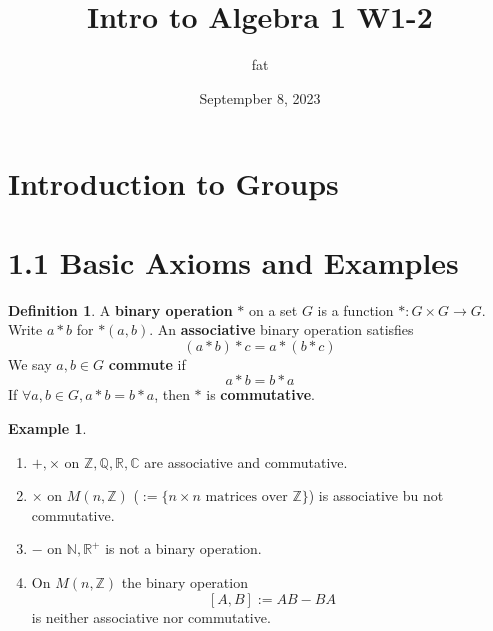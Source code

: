 \documentclass{article}
\title{Intro to Algebra 1 W1-2}
\author{fat}
\date{Septempber 8, 2023}
\theoremstyle{definition}
\newtheorem{ex}{Example}
\newtheorem{dfn}{Definition}
\newcommand{\CC}{\mathbb C}
\newcommand{\NN}{\mathbb N}
\newcommand{\QQ}{\mathbb Q}
\newcommand{\RR}{\mathbb R}
\newcommand{\ZZ}{\mathbb Z}
\begin{document}
\maketitle
\thispagestyle{fancy}
\renewcommand{\footrulewidth}{0.4pt}
\cfoot{\thepage}
\renewcommand{\headrulewidth}{0.4pt}

\section*{Introduction to Groups}

\section*{1.1 Basic Axioms and Examples}

\begin{dfn}
	A \textbf{binary operation} $*$ on a set $G$ is a function $*: G \times G \to G$.
	Write $a * b$ for $*(a, b)$.
	An \textbf{associative} binary operation satisfies 
	\[
		(a * b) * c = a * (b * c)
	\]
	We say $a, b \in G$ \textbf{commute} if 
	\[
		a * b = b * a
	\]
	If $\forall a, b \in G, a * b = b * a$, then $*$ is \textbf{commutative}.
\end{dfn}

\begin{ex}
	\begin{enumerate}
		\item[(1)] $+, \times$ on $\ZZ, \QQ, \RR, \CC$ are associative and commutative.

		\item[(2)] $\times$ on $M(n, \ZZ)$ ($:= \{n \times n \text{ matrices over }\ZZ\}$) is associative bu not commutative.

		\item[(3)] $-$ on $\NN, \RR^+$ is not a binary operation.

		\item[(4)] On $M(n, \ZZ)$ the binary operation
			\[
				[A, B]:= AB - BA
			\]
			is neither associative nor commutative.
	\end{enumerate}
\end{ex}
\end{document}
